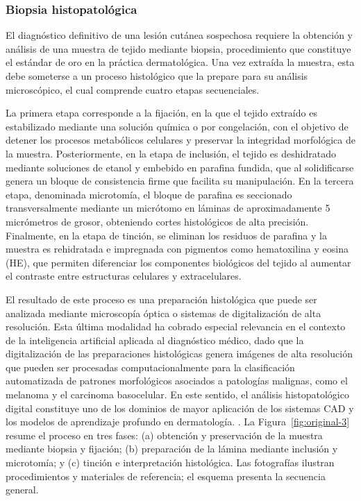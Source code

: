 \subsubsection{Biopsia histopatológica}

 El diagnóstico definitivo de una lesión cutánea sospechosa requiere la obtención y análisis de una muestra de tejido mediante biopsia, procedimiento que constituye el estándar de oro en la práctica dermatológica. Una vez extraída la muestra, esta debe someterse a un proceso histológico que la prepare para su análisis microscópico, el cual comprende cuatro etapas secuenciales.

La primera etapa corresponde a la fijación, en la que el tejido extraído es estabilizado mediante una solución química o por congelación, con el objetivo de detener los procesos metabólicos celulares y preservar la integridad morfológica de la muestra. Posteriormente, en la etapa de inclusión, el tejido es deshidratado mediante soluciones de etanol y embebido en parafina fundida, que al solidificarse genera un bloque de consistencia firme que facilita su manipulación. En la tercera etapa, denominada microtomía, el bloque de parafina es seccionado transversalmente mediante un micrótomo en láminas de aproximadamente 5 micrómetros de grosor, obteniendo cortes histológicos de alta precisión. Finalmente, en la etapa de tinción, se eliminan los residuos de parafina y la muestra es rehidratada e impregnada con pigmentos como hematoxilina y eosina (HE), que permiten diferenciar los componentes biológicos del tejido al aumentar el contraste entre estructuras celulares y extracelulares.

El resultado de este proceso es una preparación histológica que puede ser analizada mediante microscopía óptica o sistemas de digitalización de alta resolución. Esta última modalidad ha cobrado especial relevancia en el contexto de la inteligencia artificial aplicada al diagnóstico médico, dado que la digitalización de las preparaciones histológicas genera imágenes de alta resolución que pueden ser procesadas computacionalmente para la clasificación automatizada de patrones morfológicos asociados a patologías malignas, como el melanoma y el carcinoma basocelular. En este sentido, el análisis histopatológico digital constituye uno de los dominios de mayor aplicación de los sistemas CAD y los modelos de aprendizaje profundo en dermatología. \parencite{sauter2023dermatopathologyreview}. La Figura~\ref{fig:original-3} resume el proceso en tres fases: (a) obtención y preservación de la muestra mediante biopsia y fijación; (b) preparación de la lámina mediante inclusión y microtomía; y (c) tinción e interpretación histológica. Las fotografías ilustran procedimientos y materiales de referencia; el esquema presenta la secuencia general.

